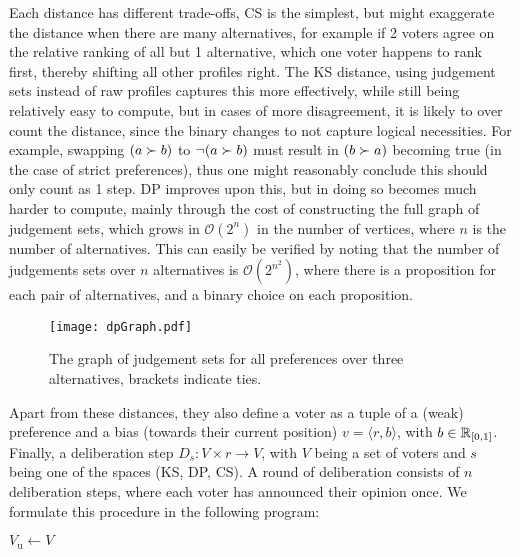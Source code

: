 Each distance has different trade-offs, CS is the simplest, but might exaggerate the distance when there are many alternatives, for example if 2 voters agree on the relative ranking of all but 1 alternative, which one voter happens to rank first, thereby shifting all other profiles right. The KS distance, using judgement sets instead of raw profiles captures this more effectively, while still being relatively easy to compute, but in cases of more disagreement, it is likely to over count the distance, since the binary changes to not capture logical necessities. For example, swapping $( a \succ b)$ to $\neg (a \succ b)$ must result in $(b \succ a)$ becoming true (in the case of strict preferences), thus one might reasonably conclude this should only count as 1 step. DP improves upon this, but in doing so becomes much harder to compute, mainly through the cost of constructing the full graph of judgement sets, which grows in $\mathcal{O}(2^{n})$ in the number of vertices, where $n$ is the number of alternatives. This can easily be verified by noting that the number of judgements sets over $n$ alternatives is $\mathcal{O}(2^{n^{2}})$, where there is a proposition for each pair of alternatives, and a binary choice on each proposition.



\vspace{1em}
\begin{figure}
	\centering
	\texttt{[image: dpGraph.pdf]}
	\caption{The graph of judgement sets for all preferences over three alternatives, brackets indicate ties.}
	\label{figure:DPDistance}
\end{figure}

Apart from these distances, they also define a voter as a tuple of a (weak) preference and a bias (towards their current position) \(v = \langle r, b \rangle\), with \( b \in \mathbb{R}_{[0,1]}\). Finally, a deliberation step \(D_{s} : V \times r \to V\), with $V$ being a set of voters and $s$ being one of the spaces (KS, DP, CS). A round of deliberation consists of $n$ deliberation steps, where each voter has announced their opinion once. We formulate this procedure in the following program:

\IncMargin{1em}
\begin{algorithm}

	\BlankLine

	$V_{\text{u}} \gets V$ \\

\end{algorithm}
\DecMargin{1em}

